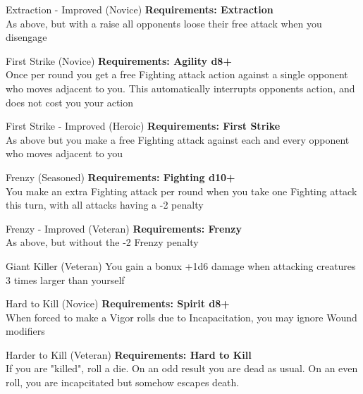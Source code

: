 \begin{multicols}{2}
\begin{genericsection}{Extraction - Improved (Novice)}
\textbf{Requirements: Extraction}\\
As above, but with a raise all opponents loose their free attack when you disengage
\end{genericsection}

\begin{genericsection}{First Strike (Novice)}
\textbf{Requirements: Agility d8+}\\
Once per round you get a free Fighting attack action against a single opponent who moves adjacent to you. This automatically interrupts opponents action, and does not cost you your action
\end{genericsection}

\begin{genericsection}{First Strike - Improved (Heroic)}
\textbf{Requirements: First Strike}\\
As above but you make a free Fighting attack against each and every opponent who moves adjacent to you
\end{genericsection}

\begin{genericsection}{Frenzy (Seasoned)}
\textbf{Requirements: Fighting d10+}\\
You make an extra Fighting attack per round when you take one Fighting attack this turn, with all attacks having a -2 penalty
\end{genericsection}

\begin{genericsection}{Frenzy - Improved (Veteran)}
\textbf{Requirements: Frenzy}\\
As above, but without the -2 Frenzy penalty
\end{genericsection}

\begin{genericsection}{Giant Killer (Veteran)}
You gain a bonux +1d6 damage when attacking creatures 3 times larger than yourself
\end{genericsection}

\begin{genericsection}{Hard to Kill (Novice)}
\textbf{Requirements: Spirit d8+}\\
When forced to make a Vigor rolls due to Incapacitation, you may ignore Wound modifiers
\end{genericsection}

\begin{genericsection}{Harder to Kill (Veteran)}
\textbf{Requirements: Hard to Kill}\\
If you are "killed", roll a die. On an odd result you are dead as usual. On an even roll, you are incapcitated but somehow escapes death.
\end{genericsection}


\end{multicols}
